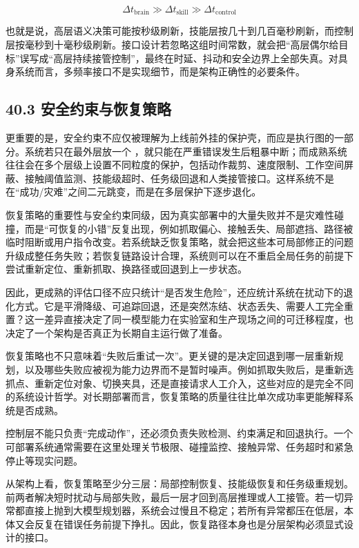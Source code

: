 \begingroup
\footnotesize
\begin{equation*}
\Delta t_{\text{brain}} \gg \Delta t_{\text{skill}} \gg \Delta t_{\text{control}}
\end{equation*}
\endgroup

也就是说，高层语义决策可能按秒级刷新，技能层按几十到几百毫秒刷新，而控制层按毫秒到十毫秒级刷新。接口设计若忽略这组时间常数，就会把“高层偶尔给目标”误写成“高层持续接管控制”，最终在时延、抖动和安全边界上全部失真。对具身系统而言，多频率接口不是实现细节，而是架构正确性的必要条件。

\subsection*{40.3 安全约束与恢复策略}


更重要的是，安全约束不应仅被理解为上线前外挂的保护壳，而应是执行图的一部分。系统若只在最外层放一个 \texttt{}，就只能在严重错误发生后粗暴中断；而成熟系统往往会在多个层级上设置不同粒度的保护，包括动作裁剪、速度限制、工作空间屏蔽、接触阈值监测、技能级超时、任务级回退和人类接管接口。这样系统不是在“成功/灾难”之间二元跳变，而是在多层保护下逐步退化。

恢复策略的重要性与安全约束同级，因为真实部署中的大量失败并不是灾难性碰撞，而是“可恢复的小错”反复出现，例如抓取偏心、接触丢失、局部遮挡、路径被临时阻断或用户指令改变。若系统缺乏恢复策略，就会把这些本可局部修正的问题升级成整任务失败；若恢复链路设计合理，系统则可以在不重启全局任务的前提下尝试重新定位、重新抓取、换路径或回退到上一步状态。

因此，更成熟的评估口径不应只统计“是否发生危险”，还应统计系统在扰动下的退化方式。它是平滑降级、可追踪回退，还是突然冻结、状态丢失、需要人工完全重置？这一差异直接决定了同一模型能力在实验室和生产现场之间的可迁移程度，也决定了一个架构是否真正为长期自主运行做了准备。

恢复策略也不只意味着“失败后重试一次”。更关键的是决定回退到哪一层重新规划，以及哪些失败应被视为能力边界而不是暂时噪声。例如抓取失败后，是重新选抓点、重新定位对象、切换夹具，还是直接请求人工介入，这些对应的是完全不同的系统设计哲学。对长期部署而言，恢复策略的质量往往比单次成功率更能解释系统是否成熟。

控制层不能只负责“完成动作”，还必须负责失败检测、约束满足和回退执行。一个可部署系统通常需要在这里处理关节极限、碰撞监控、接触异常、任务超时和紧急停止等现实问题。

从架构上看，恢复策略至少分三层：局部控制恢复、技能级恢复和任务级重规划。前两者解决短时扰动与局部失败，最后一层才回到高层推理或人工接管。若一切异常都直接上抛到大模型规划器，系统会过慢且不稳定；若所有异常都压在低层，本体又会反复在错误任务前提下挣扎。因此，恢复路径本身也是分层架构必须显式设计的接口。

